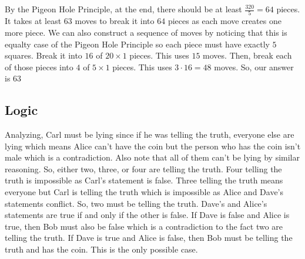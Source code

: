 \documentclass[11pt]{article}
\begin{document}
\begin{sol} 
By the Pigeon Hole Principle, at the end, there should be at least $\frac{320}{5}=64$ pieces. It takes at least $63$ moves to break it into $64$ pieces as each move creates one more piece. We can also construct a sequence of moves by noticing that this is equalty case of the Pigeon Hole Principle so each piece must have exactly $5$ squares. Break it into $16$ of $20\times 1$ pieces. This uses $15$ moves. Then, break each of those pieces into $4$ of $5\times 1$ pieces. This uses $3\cdot 16=48$ moves. So, our answer is $\boxed{63}$
\end{sol}


\subsection{Logic}

\begin{sol}
Analyzing, Carl must be lying since if he was telling the truth, everyone else are lying which means Alice can't have the coin but the person who has the coin isn't male which is a contradiction. Also note that all of them can't be lying by similar reasoning. So, either two, three, or four are telling the truth. Four telling the truth is impossible as Carl's statement is false. Three telling the truth means everyone but Carl is telling the truth which is impossible as Alice and Dave's statements conflict. So, two must be telling the truth. Dave's and Alice's statements are true if and only if the other is false. If Dave is false and Alice is true, then Bob must also be false which is a contradiction to the fact two are telling the truth. If Dave is true and Alice is false, then Bob must be telling the truth and  has the coin. This is the only possible case.
\end{sol}
\end{document}
